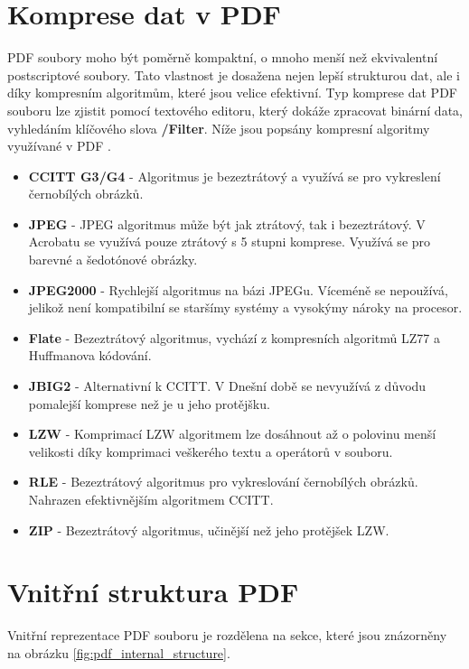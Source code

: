 \section{Komprese dat v PDF}
PDF soubory moho být poměrně kompaktní, o mnoho menší než ekvivalentní postscriptové soubory. Tato vlastnost je dosažena nejen lepší strukturou dat, ale i díky kompresním algoritmům, které jsou velice efektivní. Typ komprese dat PDF souboru lze zjistit pomocí textového editoru, který dokáže zpracovat binární data, vyhledáním klíčového slova \textbf{/Filter}. Níže jsou popsány kompresní algoritmy využívané v PDF \cite{PDFPrepressure}.
\begin{itemize}
	\item \textbf{CCITT G3/G4} - Algoritmus je bezeztrátový a využívá se pro vykreslení černobílých obrázků.
	\item \textbf{JPEG} - JPEG algoritmus může být jak ztrátový, tak i bezeztrátový. V Acrobatu se využívá pouze ztrátový s 5 stupni komprese. Využívá se pro barevné a šedotónové obrázky.
	\item \textbf{JPEG2000} - Rychlejší algoritmus na bázi JPEGu. Víceméně se nepoužívá, jelikož není kompatibilní se staršímy systémy a vysokýmy nároky na procesor.
	\item \textbf{Flate} - Bezeztrátový algoritmus, vychází z kompresních algoritmů LZ77 a Huffmanova kódování.
	\item \textbf{JBIG2} - Alternativní k CCITT. V Dnešní době se nevyužívá z důvodu pomalejší komprese než je u jeho protějšku.
	\item \textbf{LZW} - Komprimací LZW algoritmem lze dosáhnout až o polovinu menší velikosti díky komprimaci veškerého textu a operátorů v souboru.
	\item \textbf{RLE} - Bezeztrátový algoritmus pro vykreslování černobílých obrázků. Nahrazen efektivnějším algoritmem CCITT.
	\item \textbf{ZIP} - Bezeztrátový algoritmus, učinější než jeho protějšek LZW.
\end{itemize}

\section{Vnitřní struktura PDF}
Vnitřní reprezentace PDF souboru je rozdělena na sekce, které jsou znázorněny na obrázku \ref{fig:pdf_internal_structure}.

